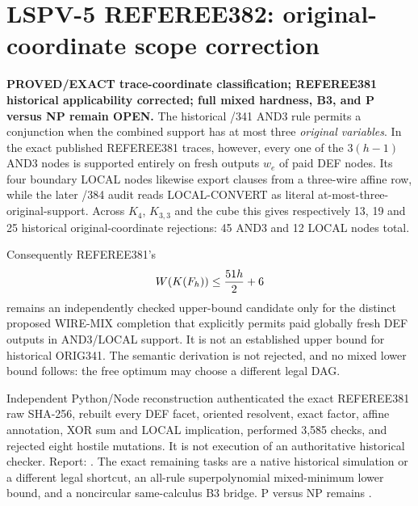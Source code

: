 \section*{LSPV-5 REFEREE382: original-coordinate scope correction}
\textbf{PROVED/EXACT trace-coordinate classification; REFEREE381 historical
applicability corrected; full mixed hardness, B3, and P versus NP remain
OPEN.}
The historical /341 AND3 rule permits a conjunction when the combined support
has at most three \emph{original variables}.  In the exact published
REFEREE381 traces, however, every one of the $3(h-1)$ AND3 nodes is supported
entirely on fresh outputs $w_e$ of paid DEF nodes.  Its four boundary LOCAL
nodes likewise export clauses from a three-wire affine row, while the later
/384 audit reads LOCAL-CONVERT as literal at-most-three-original-support.
Across $K_4$, $K_{3,3}$ and the cube this gives respectively 13, 19 and 25
historical original-coordinate rejections: 45 AND3 and 12 LOCAL nodes total.

Consequently REFEREE381's
\[
 W(K(F_h))\le {51h\over2}+6
\]
remains an independently checked upper-bound candidate only for the distinct
proposed WIRE-MIX completion that explicitly permits paid globally fresh DEF
outputs in AND3/LOCAL support.  It is not an established upper bound for
historical ORIG341.  The semantic derivation is not rejected, and no mixed
lower bound follows: the free optimum may choose a different legal DAG.

Independent Python/Node reconstruction authenticated the exact REFEREE381 raw
SHA-256, rebuilt every DEF facet, oriented resolvent, exact factor, affine
annotation, XOR sum and LOCAL implication, performed 3,585 checks, and
rejected eight hostile mutations.  It is not execution of an authoritative
historical checker.  Report:
.
The exact remaining tasks are a native historical simulation or a different
legal shortcut, an all-rule superpolynomial mixed-minimum lower bound, and a
noncircular same-calculus B3 bridge.  P versus NP remains \OPEN.
